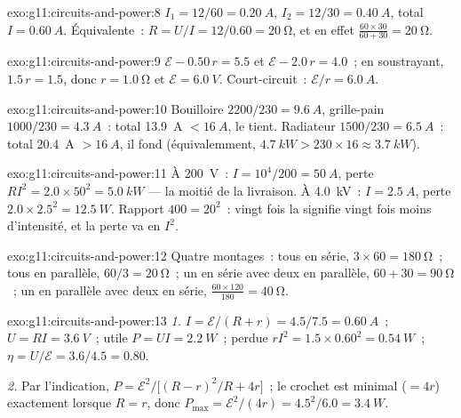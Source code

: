 \begin{solution}{exo:g11:circuits-and-power:8}
$I_1 = 12/60 = \qty{0.20}{A}$, $I_2 = 12/30 = \qty{0.40}{A}$, total
$I = \qty{0.60}{A}$. Équivalente~: $R = U/I = 12/0.60 = \qty{20}{\ohm}$,
et en effet $\frac{60 \times 30}{60 + 30} = \qty{20}{\ohm}$.
\end{solution}

\begin{solution}{exo:g11:circuits-and-power:9}
$\mathcal{E} - 0.50\,r = 5.5$ et $\mathcal{E} - 2.0\,r = 4.0$~;
en soustrayant, $1.5\,r = 1.5$, donc $r = \qty{1.0}{\ohm}$ et
$\mathcal{E} = \qty{6.0}{V}$. Court-circuit~: $\mathcal{E}/r =
\qty{6.0}{A}$.
\end{solution}

\begin{solution}{exo:g11:circuits-and-power:10}
Bouilloire $2200/230 = \qty{9.6}{A}$, grille-pain $1000/230 =
\qty{4.3}{A}$~: total \qty{13.9}{A} $< \qty{16}{A}$, le
 tient. Radiateur $1500/230 =
\qty{6.5}{A}$~: total \qty{20.4}{A} $> \qty{16}{A}$, il fond
(équivalemment, $\qty{4.7}{kW} > 230 \times 16 \approx \qty{3.7}{kW}$).
\end{solution}

\begin{solution}{exo:g11:circuits-and-power:11}
À \qty{200}{V}~: $I = 10^4/200 = \qty{50}{A}$, perte $RI^2 = 2.0 \times
50^2 = \qty{5.0}{kW}$ --- la moitié de la livraison. À \qty{4.0}{kV}~:
$I = \qty{2.5}{A}$, perte $2.0 \times 2.5^2 = \qty{12.5}{W}$. Rapport
$400 = 20^2$~: vingt fois la
 signifie vingt fois moins
d'intensité, et la perte va en $I^2$.
\end{solution}

\begin{solution}{exo:g11:circuits-and-power:12}
Quatre montages~: tous en série, $3 \times 60 = \qty{180}{\ohm}$~; tous
en parallèle, $60/3 = \qty{20}{\ohm}$~; un en série avec deux en
parallèle, $60 + 30 = \qty{90}{\ohm}$~; un en parallèle avec deux en
série, $\frac{60 \times 120}{180} = \qty{40}{\ohm}$.
\end{solution}

\begin{solution}{exo:g11:circuits-and-power:13}
\emph{1.} $I = \mathcal{E}/(R + r) = 4.5/7.5 = \qty{0.60}{A}$~;
$U = RI = \qty{3.6}{V}$~; utile $P = UI = \qty{2.2}{W}$~; perdue $rI^2 =
1.5 \times 0.60^2 = \qty{0.54}{W}$~; $\eta = U/\mathcal{E} = 3.6/4.5 =
0.80$.

\emph{2.} Par l'indication, $P = \mathcal{E}^2 \big/ \big[(R - r)^2/R +
4r\big]$~; le crochet est minimal ($= 4r$) exactement lorsque $R = r$,
donc $P_{\max} = \mathcal{E}^2/(4r) = 4.5^2/6.0 = \qty{3.4}{W}$.
\end{solution}

